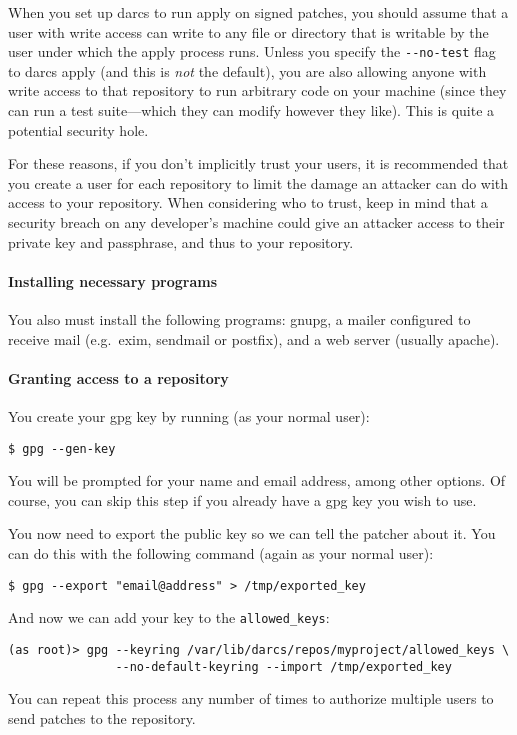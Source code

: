 \documentclass{book}
\begin{document}
When you set up darcs to run apply on signed patches, you should assume
that a user with write access can write to any file or directory that is
writable by the user under which the apply process runs.  Unless you
specify the \verb!--no-test! flag to darcs apply (and this is \emph{not}
the default), you are also allowing anyone with write access to that
repository to run arbitrary code on your machine (since they can run a test
suite---which they can modify however they like).  This is quite a
potential security hole.

For these reasons, if you don't implicitly trust your users, it is
recommended that you create a user for each repository to limit the damage
an attacker can do with access to your repository.  When considering who to
trust, keep in mind that a security breach on any developer's machine could
give an attacker access to their private key and passphrase, and thus to
your repository.

\paragraph{Installing necessary programs}

You also must install the following programs: gnupg, a mailer configured to
receive mail (e.g.\ exim, sendmail or postfix), and a web server (usually
apache).

\paragraph{Granting access to a repository}

You create your gpg key by running (as your normal user):
\begin{verbatim}
$ gpg --gen-key
\end{verbatim}
You will be prompted for your name and email address, among other options.
Of course, you can
skip this step if you already have a gpg key you wish to use.

You now need to export the public key so we can tell the patcher about it.
You can do this with the following command (again as your normal user):
\begin{verbatim}
$ gpg --export "email@address" > /tmp/exported_key
\end{verbatim}
And now we can add your key to the \verb!allowed_keys!:
\begin{verbatim}
(as root)> gpg --keyring /var/lib/darcs/repos/myproject/allowed_keys \
               --no-default-keyring --import /tmp/exported_key
\end{verbatim}
You can repeat this process any number of times to authorize multiple users
to send patches to the repository.
\end{document}
